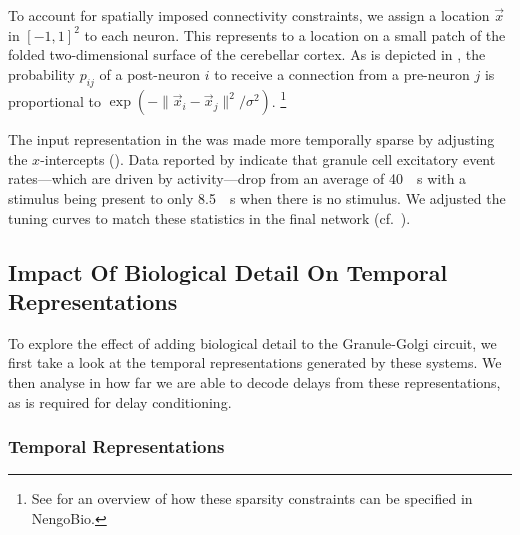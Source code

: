 To account for spatially imposed connectivity constraints, we assign a location $\vec x$ in $[-1, 1]^2$ to each neuron.
This represents to a location on a small patch of the folded two-dimensional surface of the cerebellar cortex.
As is depicted in , the probability $p_{ij}$ of a post-neuron $i$ to receive a connection from a pre-neuron $j$ is proportional to $\exp \left(- \| \vec x_i - \vec x_j \|^2 / \sigma^{2} \right)$.%
\footnote{See  for an overview of how these sparsity constraints can be specified in NengoBio.}

The input representation in the \PCN was made more temporally sparse by adjusting the $x$-intercepts ().
Data reported by \citet{chadderton2004integration} indicate that granule cell excitatory event rates---which are driven by \PCN activity---drop from an average of \SI{40}{\per\second} with a stimulus being present to only \SI{8.5}{\per\second} when there is no stimulus.
We adjusted the \PCN tuning curves to match these statistics in the final network (cf.~).


\subsection{Impact Of Biological Detail On Temporal Representations}

To explore the effect of adding biological detail to the Granule-Golgi circuit, we first take a look at the temporal representations generated by these systems.
We then analyse in how far we are able to decode delays from these representations, as is required for delay conditioning.

\subsubsection{Temporal Representations}

